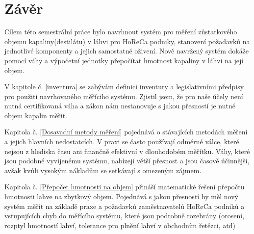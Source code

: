 \chapter*{Závěr}
{}

%
%
%



Cílem této semestrální práce bylo navrhnout systém pro měření zůstatkového objemu kapaliny(destilátu) v láhvi pro HoReCa podniky, stanovení požadavků na jednotlivé komponenty a jejich samostatné oživení. Nově navržený systém dokáže pomocí váhy a výpočetní jednotky přepočítat hmotnost kapaliny v láhvi na její objem.

V kapitole č. \ref{inventura} se zabývám definicí inventury a legislativními předpisy pro použití navrhovaného měříciho systému. Zjistil jsem, že pro naše účely není nutná certifikovaná váha a zákon nám nestanovuje s jakou přesností je nutné objem kapalin měřit. 

Kapitola č. \ref{Dosavadní metody měření} pojednává o stávajících metodách měření a jejich hlavních nedostatcích. V praxi se často používají odměrné válce, které nejsou z hlediska času ani finančně efektivní v dlouhodobém měřítku. Váhy, které jsou podobné vyvíjenému systému, nabízejí větší přesnost a jsou časově účinnější, avšak kvůli vysokým nákladům se setkávají s omezeným zájmem.

Kapitola č. \ref{Přepočet hmotnosti na objem} přináší matematické řešení přepočtu hmotnosti lahve na zbytkový objem. Pojednává s jakou přesností by měl nový systém měřit na základě praxe a požadavků zaměstnavatelů HoReCa podniků a vstupujících chyb do měřícího systému, které jsou podrobně rozebrány (orosení, rozptyl hmotností lahví, tolerance pro plnění lahví v obchodním řetězci, atd)

